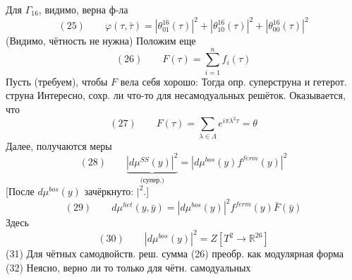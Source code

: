 \documentclass[11pt]{article}
\theoremstyle{definition}
\theoremstyle{remark}
\begin{document}
Для $\Gamma_{16}$, видимо, верна ф-ла
\begin{equation*}
(25)\qquad\varphi(\tau,\bar\tau)=|\theta_{01}^{16}(\tau)|^2
+|\theta_{10}^{16}(\tau)|^2+|\theta_{00}^{16}(\tau)|^2
\end{equation*}
(Видимо, чётность не нужна)
Положим еще
\begin{equation*}
(26)\qquad F(\tau)=\sum_{i=1}^n f_i(\tau)
\end{equation*}
Пусть (требуем), чтобы $F$ вела себя хорошо: Тогда опр. суперструна и гетерот. струна
Интересно, сохр. ли что-то для несамодуальных решёток.
Оказывается, что
\begin{equation*}
(27)\qquad F(\tau)=\sum_{\lambda\in\Lambda}e^{i\pi\lambda^2\tau}=\theta
\end{equation*}
Далее, получаются меры
\begin{equation*}
(28)\qquad\underbrace{|d\mu^{SS}(y)|^2}_{\text{(супер.)}}
=|d\mu^{bos}(y)f^{ferm}(y)|^2
\end{equation*}
[После $d\mu^{bos}(y)$ зачёркнуто: $|^2$.]
\begin{equation*}
(29)\qquad d\mu^{het}(y,\bar y)=|d\mu^{bos}(y)|^2f^{ferm}(y)\bar F(\bar y)
\end{equation*}
Здесь
\begin{equation*}
(30)\qquad|d\mu^{bos}(y)|^2=Z[T^2\to\mathbb R^{26}]
\end{equation*}
(31) Для чётных самодвойств. реш. сумма (26) преобр. как модулярная форма
(32) Неясно, верно ли то только для чётн. самодуальных
\end{document}
